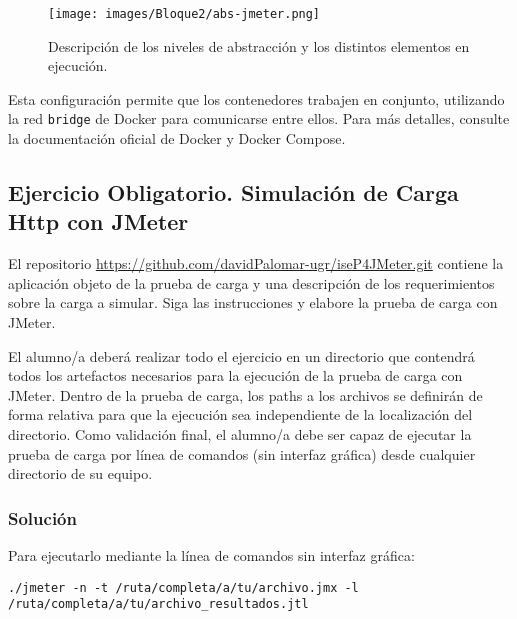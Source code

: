 \begin{figure}[H]
    \centering
    \texttt{[image: images/Bloque2/abs-jmeter.png]}
    \caption{Descripción de los niveles de abstracción y los distintos elementos en ejecución.}
    \label{fig:docker-compose}
\end{figure}

Esta configuración permite que los contenedores trabajen en conjunto, utilizando la red \texttt{bridge} de Docker para comunicarse entre ellos. Para más detalles, consulte la documentación oficial de Docker y Docker Compose.

\subsection{Ejercicio Obligatorio. Simulación de Carga Http con JMeter}

El repositorio \url{https://github.com/davidPalomar-ugr/iseP4JMeter.git} contiene la aplicación objeto de la prueba de carga y una descripción de los requerimientos sobre la carga a simular. Siga las instrucciones y elabore la prueba de carga con JMeter.

El alumno/a deberá realizar todo el ejercicio en un directorio que contendrá todos los artefactos necesarios para la ejecución de la prueba de carga con JMeter. Dentro de la prueba de carga, los paths a los archivos se definirán de forma relativa para que la ejecución sea independiente de la localización del directorio. Como validación final, el alumno/a debe ser capaz de ejecutar la prueba de carga por línea de comandos (sin interfaz gráfica) desde cualquier directorio de su equipo.

\subsubsection*{Solución}

Para ejecutarlo mediante la línea de comandos sin interfaz gráfica:
\begin{lstlisting}[style=customstyle]
    ./jmeter -n -t /ruta/completa/a/tu/archivo.jmx -l /ruta/completa/a/tu/archivo_resultados.jtl
\end{lstlisting}

